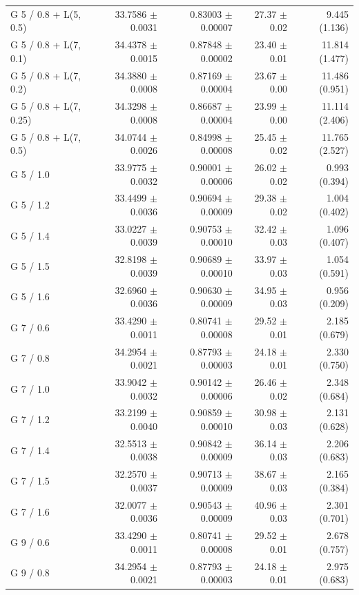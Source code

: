 \begin{longtable}{lrrrr}
G 5 / 0.8 + L(5, 0.5) & 33.7586 $\pm$ 0.0031 & 0.83003 $\pm$ 0.00007 & 27.37 $\pm$ 0.02 & 9.445 (1.136) \\
G 5 / 0.8 + L(7, 0.1) & 34.4378 $\pm$ 0.0015 & 0.87848 $\pm$ 0.00002 & 23.40 $\pm$ 0.01 & 11.814 (1.477) \\
G 5 / 0.8 + L(7, 0.2) & 34.3880 $\pm$ 0.0008 & 0.87169 $\pm$ 0.00004 & 23.67 $\pm$ 0.00 & 11.486 (0.951) \\
G 5 / 0.8 + L(7, 0.25) & 34.3298 $\pm$ 0.0008 & 0.86687 $\pm$ 0.00004 & 23.99 $\pm$ 0.00 & 11.114 (2.406) \\
G 5 / 0.8 + L(7, 0.5) & 34.0744 $\pm$ 0.0026 & 0.84998 $\pm$ 0.00008 & 25.45 $\pm$ 0.02 & 11.765 (2.527) \\
G 5 / 1.0 & 33.9775 $\pm$ 0.0032 & 0.90001 $\pm$ 0.00006 & 26.02 $\pm$ 0.02 & 0.993 (0.394) \\
G 5 / 1.2 & 33.4499 $\pm$ 0.0036 & 0.90694 $\pm$ 0.00009 & 29.38 $\pm$ 0.02 & 1.004 (0.402) \\
G 5 / 1.4 & 33.0227 $\pm$ 0.0039 & 0.90753 $\pm$ 0.00010 & 32.42 $\pm$ 0.03 & 1.096 (0.407) \\
G 5 / 1.5 & 32.8198 $\pm$ 0.0039 & 0.90689 $\pm$ 0.00010 & 33.97 $\pm$ 0.03 & 1.054 (0.591) \\
G 5 / 1.6 & 32.6960 $\pm$ 0.0036 & 0.90630 $\pm$ 0.00009 & 34.95 $\pm$ 0.03 & 0.956 (0.209) \\
G 7 / 0.6 & 33.4290 $\pm$ 0.0011 & 0.80741 $\pm$ 0.00008 & 29.52 $\pm$ 0.01 & 2.185 (0.679) \\
G 7 / 0.8 & 34.2954 $\pm$ 0.0021 & 0.87793 $\pm$ 0.00003 & 24.18 $\pm$ 0.01 & 2.330 (0.750) \\
G 7 / 1.0 & 33.9042 $\pm$ 0.0032 & 0.90142 $\pm$ 0.00006 & 26.46 $\pm$ 0.02 & 2.348 (0.684) \\
G 7 / 1.2 & 33.2199 $\pm$ 0.0040 & 0.90859 $\pm$ 0.00010 & 30.98 $\pm$ 0.03 & 2.131 (0.628) \\
G 7 / 1.4 & 32.5513 $\pm$ 0.0038 & 0.90842 $\pm$ 0.00009 & 36.14 $\pm$ 0.03 & 2.206 (0.683) \\
G 7 / 1.5 & 32.2570 $\pm$ 0.0037 & 0.90713 $\pm$ 0.00009 & 38.67 $\pm$ 0.03 & 2.165 (0.384) \\
G 7 / 1.6 & 32.0077 $\pm$ 0.0036 & 0.90543 $\pm$ 0.00009 & 40.96 $\pm$ 0.03 & 2.301 (0.701) \\
G 9 / 0.6 & 33.4290 $\pm$ 0.0011 & 0.80741 $\pm$ 0.00008 & 29.52 $\pm$ 0.01 & 2.678 (0.757) \\
G 9 / 0.8 & 34.2954 $\pm$ 0.0021 & 0.87793 $\pm$ 0.00003 & 24.18 $\pm$ 0.01 & 2.975 (0.683) \\

\end{longtable}

